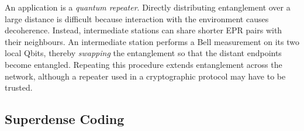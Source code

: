 An application is a \emph{quantum repeater}.
Directly distributing entanglement over a large distance is difficult because interaction with the environment causes decoherence.
Instead, intermediate stations can share shorter EPR pairs with their neighbours.
An intermediate station performs a Bell measurement on its two local Qbits, thereby \emph{swapping} the entanglement so that the distant endpoints become entangled.
Repeating this procedure extends entanglement across the network, although a repeater used in a cryptographic protocol may have to be trusted.

\subsection{Superdense Coding}\label{sec:superdense-coding}

